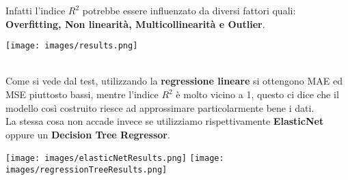 \documentclass{article}
\begin{document}
        Infatti l'indice $R^2$ potrebbe essere influenzato da diversi fattori quali: \textbf{Overfitting, Non linearità, Multicollinearità e Outlier}.\newline
        \begin{center}
            \texttt{[image: images/results.png]}
        \end{center}
        \\
        Come si vede dal test, utilizzando la \textbf{regressione lineare} si ottengono MAE ed MSE piuttosto bassi, mentre l'indice $R^2$ è molto vicino a 1, questo ci dice che il modello così costruito riesce ad approssimare particolarmente bene i dati.\newline
        \\
        La stessa cosa non accade invece se utilizziamo rispettivamente \textbf{ElasticNet} oppure un \textbf{Decision Tree Regressor}.\newline
        \begin{center}
            \texttt{[image: images/elasticNetResults.png]}
            \texttt{[image: images/regressionTreeResults.png]}
        \end{center}
        \newpage
\end{document}
